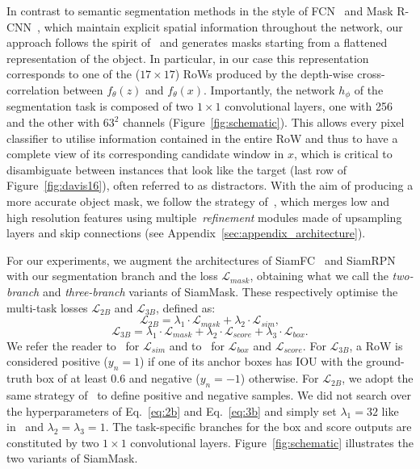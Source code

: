 \documentclass[10pt,twocolumn,letterpaper]{article}
\newcommand{\mypar}[1]{\smallskip\noindent {\bf #1}\enskip}
\begin{document}
\mypar{Mask representation.}
In contrast to semantic segmentation methods in the style of FCN~\cite{long2015fully} and Mask R-CNN~\cite{maskrcnn}, which maintain explicit spatial information throughout the network, our approach follows the spirit of~\cite{DeepMask,SharpMask} and generates masks starting from a flattened representation of the object.
In particular, in our case this representation corresponds to one of the ($17{\times}17$) RoWs produced by the depth-wise cross-correlation between $f_\theta(z)$ and $f_\theta(x)$.
Importantly, the network $h_\phi$ of the segmentation task is composed of two $1{\times}1$ convolutional layers, one with 256 and the other with $63^2$ channels (Figure~\ref{fig:schematic}).
This allows every pixel classifier to utilise information contained in the entire RoW and thus to have a complete view of its corresponding candidate window in $x$, which is critical to disambiguate between instances that look like the target (\eg last row of Figure~\ref{fig:davis16}), often referred to as distractors.
With the aim of producing a more accurate object mask, we follow the strategy of~\cite{SharpMask}, which merges low and high resolution features using multiple~\textit{refinement} modules made of upsampling layers and skip connections (see Appendix~\ref{sec:appendix_architecture}).

\mypar{Two variants.}
For our experiments, we augment the architectures of SiamFC~\cite{bertinetto2016fully} and SiamRPN~\cite{SiamRPN} with our segmentation branch and the loss $\mathcal{L}_{mask}$, obtaining what we call the \emph{two-branch} and \emph{three-branch} variants of SiamMask.
These respectively optimise the multi-task losses $\mathcal{L}_{2B}$ and $\mathcal{L}_{3B}$, defined as:
\begin{equation}
\label{eq:2b}
\mathcal{L}_{2B} = \lambda_{1} \cdot \mathcal{L}_{mask} + \lambda_{2} \cdot \mathcal{L}_{sim},
\end{equation}
\begin{equation}
\label{eq:3b}
\mathcal{L}_{3B} = \lambda_{1} \cdot \mathcal{L}_{mask} + \lambda_{2} \cdot \mathcal{L}_{score}+ \lambda_{3} \cdot \mathcal{L}_{box}.
\end{equation}
We refer the reader to~\cite[Section 2.2]{bertinetto2016fully} for $\mathcal{L}_{sim}$ and to~\cite[Section 3.2]{SiamRPN} for $\mathcal{L}_{box}$ and $\mathcal{L}_{score}$. 
For $\mathcal{L}_{3B}$, a RoW is considered positive ($y_{n} = 1$) if one of its anchor boxes has IOU with the ground-truth box of at least 0.6 and negative ($y_{n} = -1$) otherwise.
For $\mathcal{L}_{2B}$, we adopt the same strategy of~\cite{bertinetto2016fully} to define positive and negative samples.
We did not search over the hyperparameters of Eq.~\ref{eq:2b} and Eq.~\ref{eq:3b} and simply set $\lambda_1=32$ like in~\cite{DeepMask} and $\lambda_{2}=\lambda_{3}=1$.
The task-specific branches for the box and score outputs are constituted by two $1{\times}1$ convolutional layers.
Figure~\ref{fig:schematic} illustrates the two variants of SiamMask.
\end{document}
